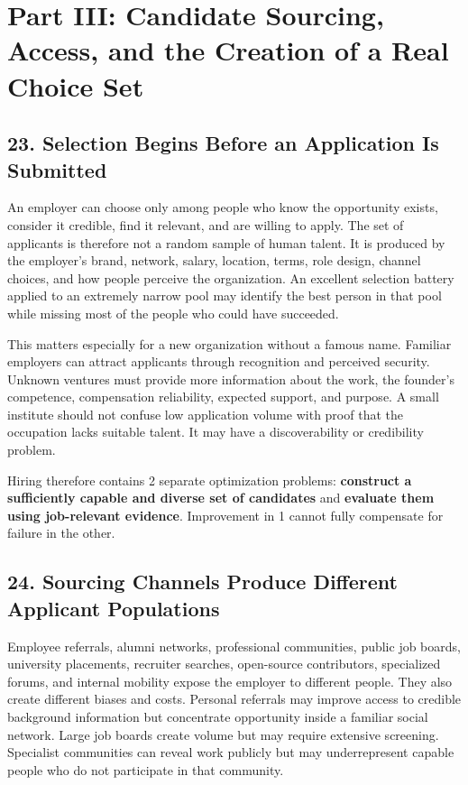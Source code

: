 \section*{Part III: Candidate Sourcing, Access, and the Creation of a Real Choice Set}

\subsection*{23. Selection Begins Before an Application Is Submitted}

An employer can choose only among people who know the opportunity exists, consider it credible, find it relevant, and are willing to apply. The set of applicants is therefore not a random sample of human talent. It is produced by the employer's brand, network, salary, location, terms, role design, channel choices, and how people perceive the organization. An excellent selection battery applied to an extremely narrow pool may identify the best person in that pool while missing most of the people who could have succeeded.

This matters especially for a new organization without a famous name. Familiar employers can attract applicants through recognition and perceived security. Unknown ventures must provide more information about the work, the founder's competence, compensation reliability, expected support, and purpose. A small institute should not confuse low application volume with proof that the occupation lacks suitable talent. It may have a discoverability or credibility problem.

Hiring therefore contains 2 separate optimization problems: \textbf{construct a sufficiently capable and diverse set of candidates} and \textbf{evaluate them using job-relevant evidence}. Improvement in 1 cannot fully compensate for failure in the other.

\subsection*{24. Sourcing Channels Produce Different Applicant Populations}

Employee referrals, alumni networks, professional communities, public job boards, university placements, recruiter searches, open-source contributors, specialized forums, and internal mobility expose the employer to different people. They also create different biases and costs. Personal referrals may improve access to credible background information but concentrate opportunity inside a familiar social network. Large job boards create volume but may require extensive screening. Specialist communities can reveal work publicly but may underrepresent capable people who do not participate in that community.

